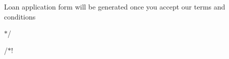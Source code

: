 
\begin{DoxyItemize}
\item 
\item Loan application form will be generated once you accept our terms and conditions
\item $\ast$/
\end{DoxyItemize}

/$\ast$! 